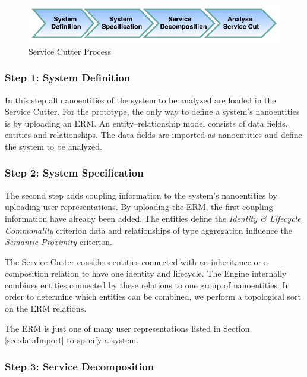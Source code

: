 \begin{figure}[H]
	\begin{center}
		\includegraphics[scale=1]{diagrams/process.pdf}
		\caption{Service Cutter Process}
		\label{fig:process}
	\end{center}
\end{figure}

\subsubsection{Step 1: System Definition}

In this step all nanoentities of the system to be analyzed are loaded in the Service Cutter. For the prototype, the only way to define a system's nanoentities is by uploading an \gls{ERM}. An entity–relationship model consists of data fields, entities and relationships. The data fields are imported as nanoentities and define the system to be analyzed.  

\subsubsection{Step 2: System Specification}

The second step adds coupling information to the system's nanoentities by uploading user representations. By uploading the \gls{ERM}, the first coupling information have already been added. The entities define the \textit{Identity \& Lifecycle Commonality} criterion data and relationships of type aggregation influence the \textit{Semantic Proximity} criterion.

The Service Cutter considers entities connected with an inheritance or a composition relation to have one identity and lifecycle. The Engine internally combines entities connected by these relations to one group of nanoentities. In order to determine which entities can be combined, we perform a topological sort\cite{pang2015topological} on the \gls{ERM} relations. 

The \gls{ERM} is just one of many user representations listed in Section \ref{sec:dataImport} to specify a system.  

\subsubsection{Step 3: Service Decomposition}


